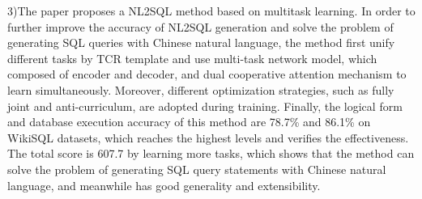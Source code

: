 \begin{englishabstract}
3)The paper proposes a NL2SQL method based on multitask learning.
In order to further improve the accuracy of NL2SQL generation and solve the problem of generating SQL queries with Chinese natural language, 
the method first unify different tasks by TCR template and use multi-task network model, which composed of encoder and decoder, and dual cooperative attention mechanism to learn simultaneously.
Moreover, different optimization strategies, such as fully joint and anti-curriculum, are adopted during training.
Finally, the logical form and database execution accuracy of this method are 78.7\% and 86.1\% on WikiSQL datasets, which reaches the highest levels and verifies the effectiveness.
The total score is 607.7 by learning more tasks, which shows that the method can solve the problem of generating SQL query statements with Chinese natural language, and meanwhile has good generality and extensibility.


\end{englishabstract}


